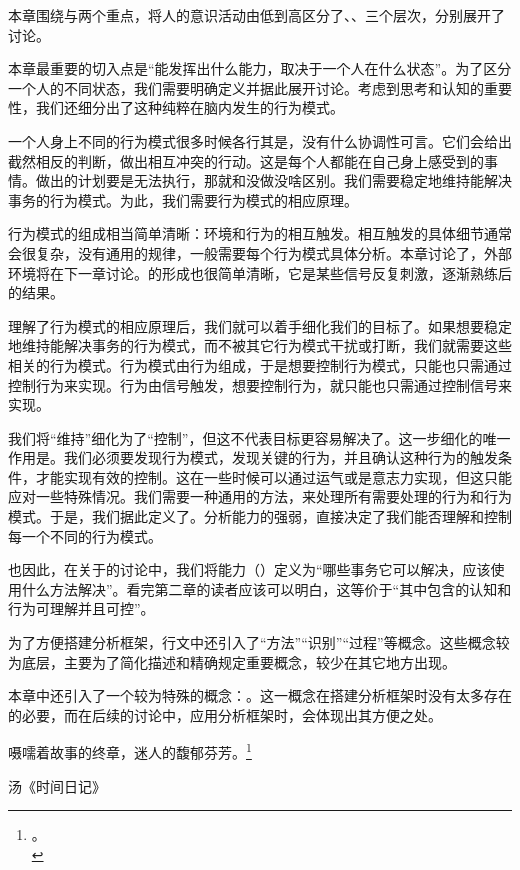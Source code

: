 本章围绕与两个重点，将人的意识活动由低到高区分了、、三个层次，分别展开了讨论。

本章最重要的切入点是“能发挥出什么能力，取决于一个人在什么状态”。为了区分一个人的不同状态，我们需要明确定义并据此展开讨论。考虑到思考和认知的重要性，我们还细分出了这种纯粹在脑内发生的行为模式。

一个人身上不同的行为模式很多时候各行其是，没有什么协调性可言。它们会给出截然相反的判断，做出相互冲突的行动。这是每个人都能在自己身上感受到的事情。做出的计划要是无法执行，那就和没做没啥区别。我们需要稳定地维持能解决事务的行为模式。为此，我们需要行为模式的相应原理。

行为模式的组成相当简单清晰：环境和行为的相互触发。相互触发的具体细节通常会很复杂，没有通用的规律，一般需要每个行为模式具体分析。本章讨论了，外部环境将在下一章讨论。的形成也很简单清晰，它是某些信号反复刺激，逐渐熟练后的结果。

理解了行为模式的相应原理后，我们就可以着手细化我们的目标了。如果想要稳定地维持能解决事务的行为模式，而不被其它行为模式干扰或打断，我们就需要这些相关的行为模式。行为模式由行为组成，于是想要控制行为模式，只能也只需通过控制行为来实现。行为由信号触发，想要控制行为，就只能也只需通过控制信号来实现。

我们将“维持”细化为了“控制”，但这不代表目标更容易解决了。这一步细化的唯一作用是。我们必须要发现行为模式，发现关键的行为，并且确认这种行为的触发条件，才能实现有效的控制。这在一些时候可以通过运气或是意志力实现，但这只能应对一些特殊情况。我们需要一种通用的方法，来处理所有需要处理的行为和行为模式。于是，我们据此定义了。分析能力的强弱，直接决定了我们能否理解和控制每一个不同的行为模式。

也因此，在关于的讨论中，我们将能力（）定义为“哪些事务它可以解决，应该使用什么方法解决”。看完第二章的读者应该可以明白，这等价于“其中包含的认知和行为可理解并且可控”。

为了方便搭建分析框架，行文中还引入了“方法”“识别”“过程”等概念。这些概念较为底层，主要为了简化描述和精确规定重要概念，较少在其它地方出现。

本章中还引入了一个较为特殊的概念：。这一概念在搭建分析框架时没有太多存在的必要，而在后续的讨论中，应用分析框架时，会体现出其方便之处。

\hfill\begin{minipage}{0.55\textwidth}
\fontsize{8pt}{12pt}\selectfont\fontsize{8pt}{12pt}
\raggedright 嗫嚅着故事的终章，迷人的馥郁芬芳。\footnote{\another{}。\\}

\raggedleft 汤《时间日记》

\end{minipage}

